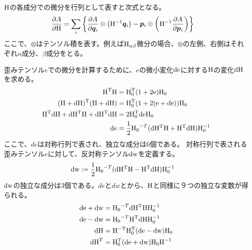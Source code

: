 \documentclass[11pt,a4paper,uplatex]{jsarticle}
\begin{document}
${\rm H}$の各成分での微分を行列として表すと次式となる。
\begin{align}
    \frac{\partial A}{\partial {\rm H}} &= \sum_{i} \left\{
    \frac{\partial A}{\partial \bm{q}_{i}} \otimes \left({\rm H}^{-1} \bm{q}_{i}\right)
    -  \bm{p}_{i} \otimes \left( {\rm H^{-1}} \frac{\partial A}{\partial \bm{p}_{i}}  \right) 
    \right\}
\end{align}
ここで、$\otimes$はテンソル積を表す。例えば${\rm H}_{\alpha \beta}$微分の場合、$\otimes$の左側、右側はそれぞれ$\alpha$成分、$\beta$成分をとる。

歪みテンソル$e$での微分を計算するために、$e$の微小変化${\rm de}$に対する${\rm H}$の変化${\rm dH}$を求める。
\begin{align}
    {\rm H^{T} H} &= {\rm H_{0}^{T}} ( 1 + 2 {\rm e}) {\rm H_{0} } \\
    {\rm (H + dH)^{T} (H+dH)} &= {\rm H_{0}^{T}} (1 + 2({\rm e+de })) {\rm H_{0} } \\
    {\rm H^{T} dH + dH^{T} H + dH^{T} dH } &= 2 {\rm H_{0}^{T} de H_{0} }\\
    {\rm de} &= \frac{1}{2} {\rm H_{0}}^{-T} ( {\rm dH^{T} H + H^{T} dH } ) {\rm H_{0}^{-1}}
\end{align}
ここで、$de$は対称行列で表され、独立な成分は6個である。
対称行列で表される歪みテンソル$e$に対して、反対称テンソル${\rm dw}$を定義する。
\begin{align}
    {\rm dw} &:= \frac{1}{2} {\rm H_{0}}^{-T} ( {\rm  dH^{T} H - H^{T} dH } ) {\rm H_{0}^{-1}} 
\end{align}
${\rm dw}$の独立な成分は3個である。$de$と$dw$とから、${\rm H}$と同様に９つの独立な変数が得られる。
\begin{align}
    {\rm de + dw} &= {\rm H_{0}}^{-T} {\rm dH^{T} H  H_{0}^{-1} } \\
    {\rm de - dw} &= {\rm H_{0}}^{-T} {\rm H^{T} dH  H_{0}^{-1} } \\
    {\rm dH} &= {\rm H^{-T} H_{0}^{T}} ({\rm de - dw}) {\rm H_{0}} \\
    {\rm dH}^{T} &= {\rm H_{0}^{T}}({\rm de + dw}) {\rm H_{0}} {\rm H}^{-1}\\
\end{align}
\end{document}
